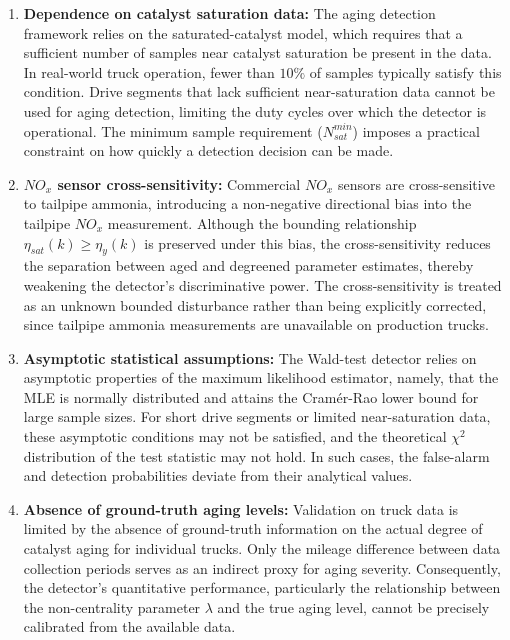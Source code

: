 \begin{enumerate}
    \item \textbf{Dependence on catalyst saturation data:}
    The aging detection framework relies on the saturated-catalyst model, which requires that a sufficient number of
    samples near catalyst saturation be present in the data. In real-world truck operation, fewer than $10\%$ of
    samples typically satisfy this condition. Drive segments that lack sufficient near-saturation data cannot be used
    for aging detection, limiting the duty cycles over which the detector is operational. The minimum sample
    requirement ($N_{sat}^{min}$) imposes a practical constraint on how quickly a detection decision can be made.

    \item \textbf{$NO_x$ sensor cross-sensitivity:}
    Commercial $NO_x$ sensors are cross-sensitive to tailpipe ammonia, introducing a non-negative directional bias into
    the tailpipe $NO_x$ measurement. Although the bounding relationship $\eta_{sat}(k) \geq \eta_y(k)$ is preserved
    under this bias, the cross-sensitivity reduces the separation between aged and degreened parameter estimates,
    thereby weakening the detector's discriminative power. The cross-sensitivity is treated as an unknown bounded
    disturbance rather than being explicitly corrected, since tailpipe ammonia measurements are unavailable on
    production trucks.

    \item \textbf{Asymptotic statistical assumptions:}
    The Wald-test detector relies on asymptotic properties of the maximum likelihood estimator, namely, that the MLE
    is normally distributed and attains the Cram\'{e}r-Rao lower bound for large sample sizes. For short drive
    segments or limited near-saturation data, these asymptotic conditions may not be satisfied, and the theoretical
    $\chi^2$ distribution of the test statistic may not hold. In such cases, the false-alarm and detection
    probabilities deviate from their analytical values.

    \item \textbf{Absence of ground-truth aging levels:}
    Validation on truck data is limited by the absence of ground-truth information on the actual degree of catalyst
    aging for individual trucks. Only the mileage difference between data collection periods serves as an indirect
    proxy for aging severity. Consequently, the detector's quantitative performance, particularly the relationship
    between the non-centrality parameter $\lambda$ and the true aging level, cannot be precisely calibrated from the
    available data.


\end{enumerate}
